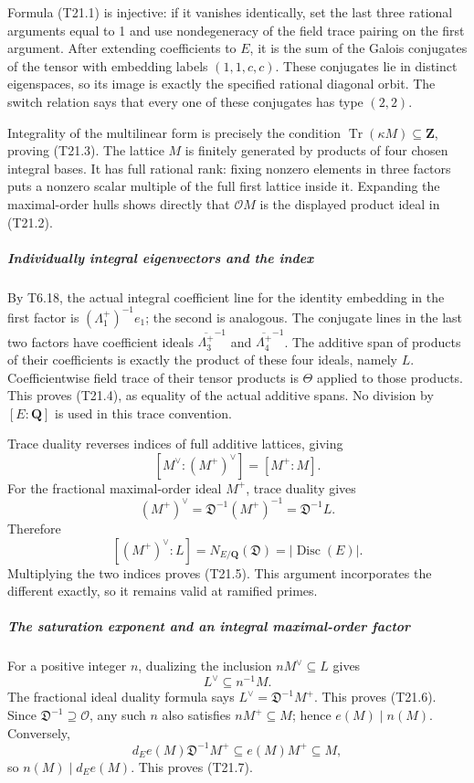 Formula (T21.1) is injective: if it vanishes identically, set the last three rational arguments equal to 1 and use nondegeneracy of the field trace pairing on the first argument. After extending coefficients to \(E\), it is the sum of the Galois conjugates of the tensor with embedding labels \((1,1,c,c)\). These conjugates lie in distinct eigenspaces, so its image is exactly the specified rational diagonal orbit. The switch relation says that every one of these conjugates has type \((2,2)\).

Integrality of the multilinear form is precisely the condition \(\operatorname{Tr}(\kappa M)\subseteq\mathbf Z\), proving (T21.3). The lattice \(M\) is finitely generated by products of four chosen integral bases. It has full rational rank: fixing nonzero elements in three factors puts a nonzero scalar multiple of the full first lattice inside it. Expanding the maximal-order hulls shows directly that \(\mathcal O M\) is the displayed product ideal in (T21.2).

\subparagraph{Individually integral eigenvectors and the index}\label{individually-integral-eigenvectors-and-the-index}

By T6.18, the actual integral coefficient line for the identity embedding in the first factor is \((\Lambda_1^+)^{-1}e_1\); the second is analogous. The conjugate lines in the last two factors have coefficient ideals \(\overline{\Lambda_3^+}^{-1}\) and \(\overline{\Lambda_4^+}^{-1}\). The additive span of products of their coefficients is exactly the product of these four ideals, namely \(L\). Coefficientwise field trace of their tensor products is \(\Theta\) applied to those products. This proves (T21.4), as equality of the actual additive spans. No division by \([E:\mathbf Q]\) is used in this trace convention.

Trace duality reverses indices of full additive lattices, giving \[
 [M^\vee:(M^+)^\vee]=[M^+:M].
\] For the fractional maximal-order ideal \(M^+\), trace duality gives \[
 (M^+)^\vee=\mathfrak D^{-1}(M^+)^{-1}
                    =\mathfrak D^{-1}L.
\] Therefore \[
 [(M^+)^\vee:L]=N_{E/\mathbf Q}(\mathfrak D)
                     =|\operatorname{Disc}(E)|.
\] Multiplying the two indices proves (T21.5). This argument incorporates the different exactly, so it remains valid at ramified primes.

\subparagraph{The saturation exponent and an integral maximal-order factor}\label{the-saturation-exponent-and-an-integral-maximal-order-factor}

For a positive integer \(n\), dualizing the inclusion \(nM^\vee\subseteq L\) gives \[
 L^\vee\subseteq n^{-1}M.
\] The fractional ideal duality formula says \(L^\vee=\mathfrak D^{-1}M^+\). This proves (T21.6). Since \(\mathfrak D^{-1}\supseteq\mathcal O\), any such \(n\) also satisfies \(nM^+\subseteq M\); hence \(e(M)\mid n(M)\). Conversely, \[
 d_E e(M)\mathfrak D^{-1}M^+
  \subseteq e(M)M^+\subseteq M,
\] so \(n(M)\mid d_E e(M)\). This proves (T21.7).

